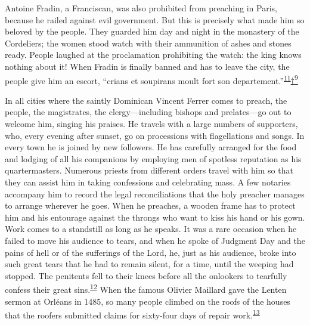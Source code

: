 Antoine Fradin, a Franciscan, was also prohibited from preaching in
Paris, because he railed against evil government. But this is precisely
what made him so beloved by the people. They guarded him day and night
in the monastery of the Cordeliers; the women stood watch with their
ammunition of ashes and stones ready. People laughed at the proclamation
prohibiting the watch: the king knows nothing about it! When Fradin is
finally banned and has to leave the city, the people give him an escort,
``crians et soupirans moult fort son
departement.''\textsuperscript{\protect\hypertarget{08_Chapter_One__THE_PASSIONATE_INTE.xhtmlux5cux23id_2208}{\protect\hyperlink{23_NOTES.xhtmlux5cux23id_2209}{11}}}\protect\hypertarget{08_Chapter_One__THE_PASSIONATE_INTE.xhtmlux5cux23id_2262}{\protect\hyperlink{23_NOTES.xhtmlux5cux23id_2264}{†\textsuperscript{9}}}

In all cities where the saintly Dominican Vincent Ferrer comes to
preach, the people, the magistrates, the clergy---including bishops and
prelates---go out to welcome him, singing his praises. He travels with a
large numbers of supporters, who, every evening after sunset, go on
processions with flagellations and songs. In every town he is joined by
new followers. He has carefully arranged for the food and lodging of all
his companions by employing men of spotless reputation as his
quartermasters. Numerous priests from different orders travel with him
so that they can assist him in taking confessions and celebrating mass.
A few notaries accompany him to record the legal reconciliations that
the holy preacher manages to arrange wherever he goes. When he preaches,
a wooden frame has to protect him and his entourage against the
\protect\hypertarget{08_Chapter_One__THE_PASSIONATE_INTE.xhtmlux5cux23page_6}{}{}throngs
who want to kiss his hand or his gown. Work comes to a standstill as
long as he speaks. It was a rare occasion when he failed to move his
audience to tears, and when he spoke of Judgment Day and the pains of
hell or of the sufferings of the Lord, he, just as his audience, broke
into such great tears that he had to remain silent, for a time, until
the weeping had stopped. The penitents fell to their knees before all
the onlookers to tearfully confess their great
sins.\textsuperscript{\protect\hypertarget{08_Chapter_One__THE_PASSIONATE_INTE.xhtmlux5cux23id_2206}{\protect\hyperlink{23_NOTES.xhtmlux5cux23id_2207}{12}}}
When the famous Olivier Maillard gave the Lenten sermon at Orléans in
1485, so many people climbed on the roofs of the houses that the roofers
submitted claims for sixty-four days of repair
work.\textsuperscript{\protect\hypertarget{08_Chapter_One__THE_PASSIONATE_INTE.xhtmlux5cux23id_2204}{\protect\hyperlink{23_NOTES.xhtmlux5cux23id_2205}{13}}}

